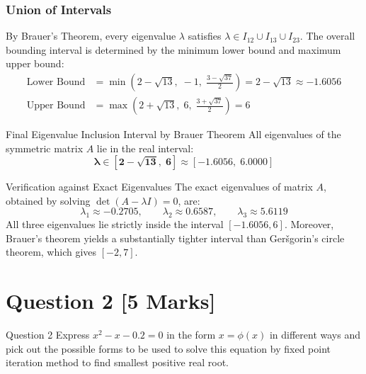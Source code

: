 \documentclass[11pt,a4paper]{article}
\begin{document}
\subsubsection*{Union of Intervals}
By Brauer's Theorem, every eigenvalue $\lambda$ satisfies $\lambda \in I_{12} \cup I_{13} \cup I_{23}$. The overall bounding interval is determined by the minimum lower bound and maximum upper bound:
\begin{align}
\text{Lower Bound} &= \min\left( 2 - \sqrt{13}, \; -1, \; \frac{3 - \sqrt{37}}{2} \right) = 2 - \sqrt{13} \approx -1.6056 \\
\text{Upper Bound} &= \max\left( 2 + \sqrt{13}, \; 6, \; \frac{3 + \sqrt{37}}{2} \right) = 6
\end{align}

\begin{answerbox}{Final Eigenvalue Inclusion Interval by Brauer Theorem}
All eigenvalues of the symmetric matrix $A$ lie in the real interval:
\begin{equation}
\mathbf{\lambda \in \left[ 2 - \sqrt{13}, \; 6 \right] \approx [-1.6056, \; 6.0000]}
\end{equation}
\end{answerbox}

\begin{notebox}{Verification against Exact Eigenvalues}
The exact eigenvalues of matrix $A$, obtained by solving $\det(A - \lambda I) = 0$, are:
\[
\lambda_1 \approx -0.2705, \qquad \lambda_2 \approx 0.6587, \qquad \lambda_3 \approx 5.6119
\]
All three eigenvalues lie strictly inside the interval $[-1.6056, 6]$. Moreover, Brauer's theorem yields a substantially tighter interval than Ger\v{s}gorin's circle theorem, which gives $[-2, 7]$.
\end{notebox}

\newpage

\section*{Question 2 \hfill \normalsize\normalfont\color{darkgray}[5 Marks]}

\begin{questionbox}{Question 2}
Express $x^2 - x - 0.2 = 0$ in the form $x = \phi(x)$ in different ways and pick out the possible forms to be used to solve this equation by fixed point iteration method to find smallest positive real root.
\end{questionbox}
\end{document}
